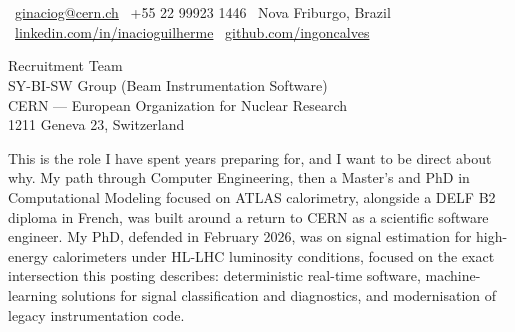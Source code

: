 \documentclass[11pt,a4paper]{article}
\begin{document}

\noindent%
\begin{minipage}[t]{\dimexpr\linewidth-3cm\relax}%
\\[0.4em]
\\[0.8em]
{\color{LightGrey}\small
\faEnvelope\ \href{mailto:ginaciog@cern.ch}{ginaciog@cern.ch}\contactBullet%
\faPhone\ +55 22 99923 1446\contactBullet%
\faMapMarker\ Nova Friburgo, Brazil\\[0.3em]
\faLinkedin\ \href{https://linkedin.com/in/inacioguilherme}{linkedin.com/in/inacioguilherme}\contactBullet%
\faGithub\ \href{https://github.com/ingoncalves}{github.com/ingoncalves}
}%
\end{minipage}%
\hfill%
\begin{minipage}[t]{2.7cm}%
%
\end{minipage}%
\par

\vspace{0.75em}
\dividerLine
\vspace{1.25em}



\vspace{1em}


{\color{SlateGrey}
Recruitment Team\\
SY-BI-SW Group (Beam Instrumentation Software)\\
CERN — European Organization for Nuclear Research\\
1211 Geneva 23, Switzerland
}

\vspace{1.25em}



\vspace{1em}




This is the role I have spent years preparing for, and I want to be direct about why. My path through Computer Engineering, then a Master's and PhD in Computational Modeling focused on ATLAS calorimetry, alongside a DELF B2 diploma in French, was built around a return to CERN as a scientific software engineer. My PhD, defended in February 2026, was on signal estimation for high-energy calorimeters under HL-LHC luminosity conditions, focused on the exact intersection this posting describes: deterministic real-time software, machine-learning solutions for signal classification and diagnostics, and modernisation of legacy instrumentation code.
\end{document}
